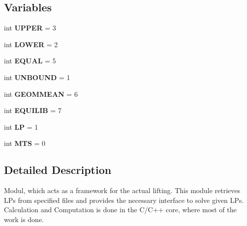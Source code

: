 \subsection*{Variables}
\begin{DoxyCompactItemize}
\item 
\hypertarget{namespacesymLPExperiments_a9a922fb530cc4e5f4b3815131fa3c371}{int {\bfseries U\-P\-P\-E\-R} = 3}\label{namespacesymLPExperiments_a9a922fb530cc4e5f4b3815131fa3c371}

\item 
\hypertarget{namespacesymLPExperiments_a59472bb37d81ca8001d5cc3353cf4eaa}{int {\bfseries L\-O\-W\-E\-R} = 2}\label{namespacesymLPExperiments_a59472bb37d81ca8001d5cc3353cf4eaa}

\item 
\hypertarget{namespacesymLPExperiments_a46b8d304e13a7c4130a3188af48eb75f}{int {\bfseries E\-Q\-U\-A\-L} = 5}\label{namespacesymLPExperiments_a46b8d304e13a7c4130a3188af48eb75f}

\item 
\hypertarget{namespacesymLPExperiments_a28e15d061ce80b2268c38cf230c47234}{int {\bfseries U\-N\-B\-O\-U\-N\-D} = 1}\label{namespacesymLPExperiments_a28e15d061ce80b2268c38cf230c47234}

\item 
\hypertarget{namespacesymLPExperiments_af086c1b10d5e4ab2988e689c83bf3f2b}{int {\bfseries G\-E\-O\-M\-M\-E\-A\-N} = 6}\label{namespacesymLPExperiments_af086c1b10d5e4ab2988e689c83bf3f2b}

\item 
\hypertarget{namespacesymLPExperiments_a973f0d69838ed63d09a2d13b5eb5f93a}{int {\bfseries E\-Q\-U\-I\-L\-I\-B} = 7}\label{namespacesymLPExperiments_a973f0d69838ed63d09a2d13b5eb5f93a}

\item 
\hypertarget{namespacesymLPExperiments_a6680909d6fdcc093706c541e3e3295ec}{int {\bfseries L\-P} = 1}\label{namespacesymLPExperiments_a6680909d6fdcc093706c541e3e3295ec}

\item 
\hypertarget{namespacesymLPExperiments_ae4e28dbe2606236884d4f5968b2784b6}{int {\bfseries M\-T\-S} = 0}\label{namespacesymLPExperiments_ae4e28dbe2606236884d4f5968b2784b6}

\end{DoxyCompactItemize}


\subsection{Detailed Description}
Modul, which acts as a framework for the actual lifting. This module retrieves L\-Ps from specified files and provides the necessary interface to solve given L\-Ps. Calculation and Computation is done in the C/\-C++ core, where most of the work is done. 

